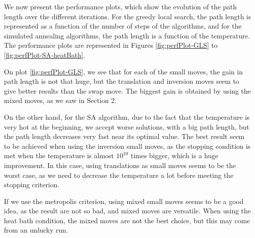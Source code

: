 \documentclass[a4paper, 11pt]{scrartcl}
\begin{document}
We now present the performance plots, which show the evolution of the path length over the different
iterations. For the greedy local search, the path length is represented as a function of the number of steps
of the algorithms, and for the simulated annealing algorithms, the path length is a function of the
temperature. The performance plots are represented in Figures \ref{fig:perfPlot-GLS} to
\ref{fig:perfPlot-SA-heatBath}.

On plot \ref{fig:perfPlot-GLS}, we see that for each of the small moves, the gain in path length is not that
huge, but the translation and inversion moves seem to give better results than the swap move. The biggest gain
is obtained by using the mixed moves, as we saw in Section 2.

On the other hand, for the SA algorithm, due to the fact that the temperature is very hot at the beginning, we
accept worse solutions, with a big path length, but the path length decreases very fast near its optimal
value. The best result seem to be achieved when using the inversion small moves, as the stopping condition is
met when the temperature is almost $10^{10}$ times bigger, which is a huge improvement. In this case, using
translations as small moves seems to be the worst case, as we need to decrease the temperature a lot before
meeting the stopping criterion. 

If we use the metropolis criterion, using mixed small moves seems to be a good idea, as the result are not so
bad, and mixed moves are versatile. When using the heat bath condition, the mixed moves are not the best
choice, but this may come from an unlucky run. 
\end{document}
